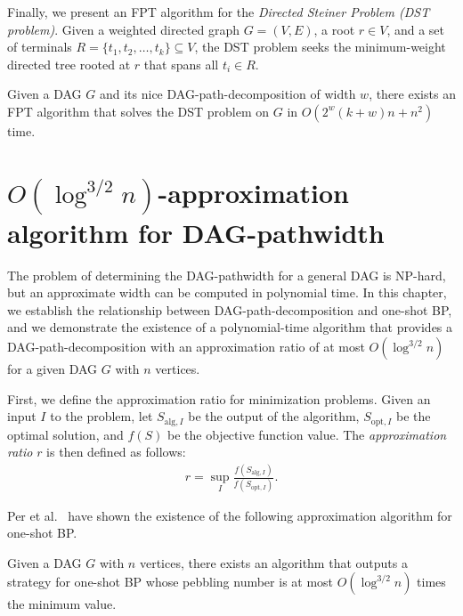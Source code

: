 \documentclass[runningheads]{llncs}
\theoremstyle{plain}
\theoremstyle{definition}
\begin{document}
Finally, we present an FPT algorithm for the \emph{Directed Steiner Problem (DST problem)}.  
Given a weighted directed graph \(G = (V, E)\), a root \(r \in V\), and a set of terminals \(R = \{t_1, t_2, \dots, t_k\} \subseteq V\), the DST problem seeks the minimum-weight directed tree rooted at \(r\) that spans all \(t_i \in R\).  

\begin{theorem}\label{theorem_DST}
    Given a DAG \(G\) and its nice DAG-path-decomposition of width \(w\), there exists an FPT algorithm that solves the DST problem on \(G\) in \(O(2^w (k+w) n + n^2)\) time.  
\end{theorem}















\section{$O(\log^{3/2} n)$-approximation algorithm for DAG-pathwidth}\label{chapter4}

The problem of determining the DAG-pathwidth for a general DAG is NP-hard, but an approximate width can be computed in polynomial time. In this chapter, we establish the relationship between DAG-path-decomposition and one-shot BP, and we demonstrate the existence of a polynomial-time algorithm that provides a DAG-path-decomposition with an approximation ratio of at most $O(\log ^{3/2} n)$ for a given DAG $G$ with $n$ vertices.

First, we define the approximation ratio for minimization problems. Given an input $I$ to the problem, let $S_{\mathrm{alg}, I}$ be the output of the algorithm, $S_{\mathrm{opt}, I}$ be the optimal solution, and $f(S)$ be the objective function value. The \emph{approximation ratio} $r$ is then defined as follows:
\begin{align*}
    r = \sup_{I}\frac{f(S_{\mathrm{alg}, I})}{f(S_{\mathrm{opt}, I})}.
\end{align*}

Per et al.~\cite{art20} have shown the existence of the following approximation algorithm for one-shot BP.

\begin{proposition}
    Given a DAG $G$ with $n$ vertices, there exists an algorithm that outputs a strategy for one-shot BP whose pebbling number is at most $O(\log ^{3/2} n)$ times the minimum value.
\end{proposition}
\end{document}
